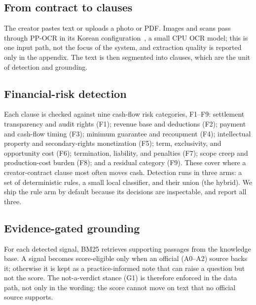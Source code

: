 \documentclass{article}
\theoremstyle{plain}
\begin{document}
\subsection{From contract to clauses}
The creator pastes text or uploads a photo or PDF. Images and scans pass through
PP-OCR in its Korean configuration~\citep{du2020ppocr}, a small CPU OCR model;
this is one input path, not the focus of the system, and extraction quality is
reported only in the appendix. The text is then segmented into clauses, which are
the unit of detection and grounding.

\subsection{Financial-risk detection}
Each clause is checked against nine cash-flow risk categories, F1--F9: settlement
transparency and audit rights (F1); revenue base and deductions (F2); payment and
cash-flow timing (F3); minimum guarantee and recoupment (F4); intellectual
property and secondary-rights monetization (F5); term, exclusivity, and
opportunity cost (F6); termination, liability, and penalties (F7); scope creep and
production-cost burden (F8); and a residual category (F9). These cover where a
creator-contract clause most often moves cash. Detection runs in three arms: a set
of deterministic rules, a small local classifier, and their union (the hybrid).
We ship the rule arm by default because its decisions are inspectable, and report
all three.

\subsection{Evidence-gated grounding}
For each detected signal, BM25 retrieves supporting passages from the knowledge
base. A signal becomes score-eligible only when an official (A0--A2) source backs
it; otherwise it is kept as a practice-informed note that can raise a question but
not the score. The not-a-verdict stance (G1) is therefore enforced in the data
path, not only in the wording: the score cannot move on text that no official
source supports.
\end{document}
